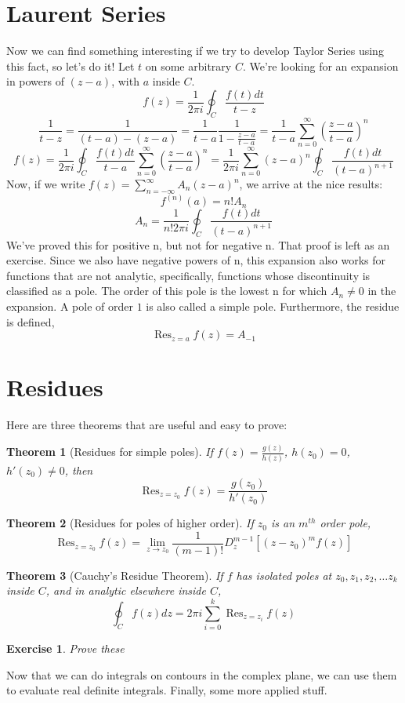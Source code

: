 \documentclass[11pt,notitlepage]{article}
\DeclareMathOperator*{\res}{Res}
\newtheorem{thm}{Theorem}[section]
\newtheorem{exc}{Exercise}[section]
\begin{document}
\section{Laurent Series}
Now we can find something interesting if we try to develop Taylor Series using this fact, so let's do it! Let $t$ on some arbitrary $C$. We're looking for an expansion in powers of $(z-a)$, with $a$ inside $C$. 
$$ f(z) = \frac1{2\pi i}\oint_{C} \frac{f(t) dt}{t-z} $$
$$\frac1{t-z} = \frac1{(t-a)-(z-a)} = \frac1{t-a}\frac1{1-{\frac{z-a}{t-a}}} = \frac1{t-a}\sum_{n=0}^\infty\left(\frac{z-a}{t-a}\right)^n $$
$$ f(z) = \frac1{2\pi i}\oint_{C} \frac{f(t) dt}{t-a} \sum_{n=0}^\infty\left(\frac{z-a}{t-a}\right)^n  = \frac1{2\pi i} \sum_{n=0}^\infty{(z-a)}^n \oint_{C} \frac{f(t) dt}{(t-a)^{n+1}} $$
Now, if we write $f(z) = \sum_{n=-\infty}^\infty A_n (z-a)^n$, we arrive at the nice results:
 $$f^{(n)}(a) = n! A_n$$
 $$A_n = \frac1{n!2\pi i} \oint_{C}\frac{f(t) dt}{(t-a)^{n+1}}$$
We've proved this for positive n, but not for negative n. That proof is left as an exercise.
Since we also have negative powers of n, this expansion also works for functions that are not analytic, specifically, functions whose discontinuity is classified as a pole. The order of this pole is the lowest n for which $A_n \not=0$ in the expansion. A pole of order $1$ is also called a simple pole. Furthermore, the residue is defined, $$\res_{z=a} f(z) = A_{-1}$$
\section{Residues}
Here are three theorems that are useful and easy to prove:
\begin{thm}[Residues for simple poles]
If $f(z)=\frac{g(z)}{h(z)}$, $h(z_0)=0$, $h'(z_0)\not=0$, then $$\res_{z=z_0} f(z) = \frac{g(z_0)}{h'(z_0)}$$
\end{thm}
\begin{thm}[Residues for poles of higher order]
If $z_0$ is an $m^{th}$ order pole, 
$$\res_{z=z_0} f(z) = \lim_{z\rightarrow z_0} \frac1{(m-1)!} D_z^{m-1} \left[(z-z_0)^m f(z)\right]$$
\end{thm}
\begin{thm}[Cauchy's Residue Theorem]
If $f$ has isolated poles at $z_0,z_1,z_2, \ldots z_k$ inside $C$, and in analytic elsewhere inside $C$,
$$\oint_C f(z) dz = 2\pi i\sum_{i=0}^k \res_{z=z_i} f(z)$$
\end{thm}
\begin{exc} Prove these
\end{exc}
Now that we can do integrals on contours in the complex plane, we can use them to evaluate real definite integrals. Finally, some more applied stuff.
\end{document}
